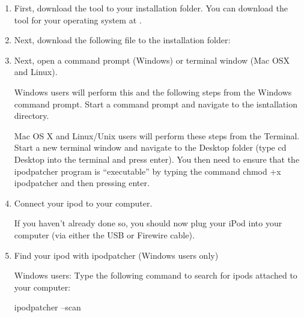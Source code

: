 \begin{enumerate} 

  \item First, download the  tool to your installation 
  folder.  You can download the  tool for your operating 
  system at .
  
  \item Next, download the following file to the installation folder: 


  \item Next, open a command prompt (Windows) or terminal window (Mac OSX and Linux).
  
    Windows users will perform this and the following steps from the Windows 
    command prompt. Start a command prompt and navigate to the isntallation 
    directory.

    Mac OS X and Linux/Unix users will perform these steps from the Terminal. 
    Start a new terminal window and navigate to the Desktop folder (type cd 
    Desktop into the terminal and press enter). You then need to ensure that the 
    ipodpatcher program is ``executable'' by typing the command chmod +x 
    ipodpatcher and then pressing enter.
  
  \item Connect your ipod to your computer.

    If you haven't already done so, you should now plug your iPod into your 
    computer (via either the USB or Firewire cable).


  \item Find your ipod with ipodpatcher (Windows users only)

    Windows users:  Type the following command to search for ipods attached to 
    your computer: 
      \begin{code} 
        ipodpatcher --scan 
      \end{code}
    

\end{enumerate}
